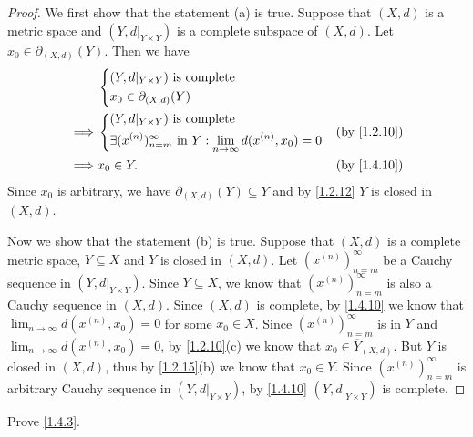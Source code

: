 \begin{proof}
  We first show that the statement (a) is true.
  Suppose that \((X, d)\) is a metric space and \((Y, d|_{Y \times Y})\) is a complete subspace of \((X, d)\).
  Let \(x_0 \in \partial_{(X, d)}(Y)\).
  Then we have
  \begin{align*}
             & \begin{dcases}
                 (Y, d|_{Y \times Y}) \text{ is complete} \\
                 x_0 \in \partial_{(X, d)}(Y)
               \end{dcases}                                                                                         \\
    \implies & \begin{dcases}
                 (Y, d|_{Y \times Y}) \text{ is complete} \\
                 \exists (x^{(n)})_{n = m}^\infty \text{ in } Y : \lim_{n \to \infty} d(x^{(n)}, x_0) = 0
               \end{dcases} &  & \by{1.2.10}                   \\
    \implies & x_0 \in Y.                                                                                                      &  & \by{1.4.10}
  \end{align*}
  Since \(x_0\) is arbitrary, we have \(\partial_{(X, d)}(Y) \subseteq Y\) and by \cref{1.2.12} \(Y\) is closed in \((X, d)\).

  Now we show that the statement (b) is true.
  Suppose that \((X, d)\) is a complete metric space, \(Y \subseteq X\) and \(Y\) is closed in \((X, d)\).
  Let \((x^{(n)})_{n = m}^\infty\) be a Cauchy sequence in \((Y, d|_{Y \times Y})\).
  Since \(Y \subseteq X\), we know that \((x^{(n)})_{n = m}^\infty\) is also a Cauchy sequence in \((X, d)\).
  Since \((X, d)\) is complete, by \cref{1.4.10} we know that \(\lim_{n \to \infty} d(x^{(n)}, x_0) = 0\) for some \(x_0 \in X\).
  Since \((x^{(n)})_{n = m}^\infty\) is in \(Y\) and \(\lim_{n \to \infty} d(x^{(n)}, x_0) = 0\), by \cref{1.2.10}(c) we know that \(x_0 \in \overline{Y}_{(X, d)}\).
  But \(Y\) is closed in \((X, d)\), thus by \cref{1.2.15}(b) we know that \(x_0 \in Y\).
  Since \((x^{(n)})_{n = m}^\infty\) is arbitrary Cauchy sequence in \((Y, d|_{Y \times Y})\), by \cref{1.4.10} \((Y, d|_{Y \times Y})\) is complete.
\end{proof}

\exercisesection

\begin{ex}\label{ex:1.4.1}
  Prove \cref{1.4.3}.
\end{ex}

